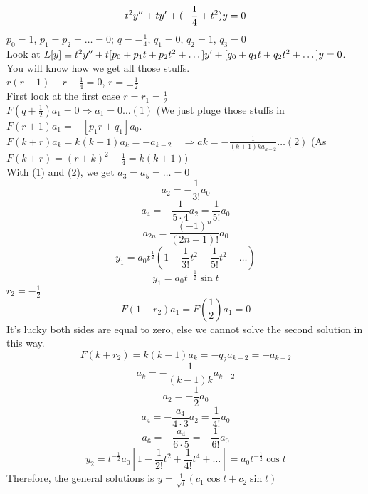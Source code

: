\begin{example}
\[t^2y^{\prime\prime}+ty^{\prime}+(-\frac{1}{4}+t^2)y=0
\]
$p_0=1$, $p_1=p_2=\dots=0$; $q=-\frac{1}{4}$, $q_1=0$, $q_2=1$, $q_3=0$\\Look at $L[y]\equiv t^2y^{\prime\prime}+t[p_0+p_1t+p_2t^2+\dots]y^{\prime}+[q_0+q_1t+q_2t^2+\dots]y=0$. You will know how we get all those stuffs.\\
$r(r-1)+r-\frac{1}{4}=0$, $r=\pm\frac{1}{2}$\\
First look at the first case $r=r_1=\frac{1}{2}$\\
$F(q+\frac{1}{2})a_1=0\Rightarrow a_1=0\dots(1)$ (We just pluge those stuffs in $F(r+1)a_1=-[p_1r+q_1]a_0$. \\
$F(k+r)a_k=k(k+1)a_k=-a_{k-2}\quad\Rightarrow ak=-\frac{1}{(k+1)ka_{k-2}}\dots(2)$  (As $F(k+r)=(r+k)^2-\frac{1}{4}=k(k+1)$)\\
With (1) and (2), we get $a_3=a_5=\dots=0$
\[a_2=-\frac{1}{3!}a_0
\]
\[a_4=-\frac{1}{5\cdot4}a_2=\frac{1}{5!}a_0
\]
\[a_{2n}=\frac{(-1)^n}{(2n+1)!}a_0
\]
\[y_1=a_0t^{\frac{1}{2}}(1-\frac{1}{3!}t^2+\frac{1}{5!}t^2-\dots)
\]
\[y_1=a_0t^{-\frac{1}{2}}\sin t
\]
$r_2=-\frac{1}{2}$
\[F(1+r_2)a_1=F(\frac{1}{2})a_1=0
\]
It's lucky both sides are equal to zero, else we cannot solve the second solution in this way.
\[F(k+r_2)=k(k-1)a_k=-q_2a_{k-2}=-a_{k-2}
\]
\[a_k=-\frac{1}{(k-1)k}a_{k-2}
\]
\[a_2=-\frac{1}{2}a_0
\]
\[a_4=-\frac{a_4}{4\cdot3}a_2=\frac{1}{4!}a_0
\]
\[a_6=-\frac{a_4}{6\cdot5}=-\frac{1}{6!}a_0
\]
\[y_2=t^{-\frac{1}{2}}a_0[1-\frac{1}{2!}t^2+\frac{1}{4!}t^4+\dots]=a_0t^{-\frac{1}{2}}\cos t
\]
Therefore, the general solutions is $y=\frac{1}{\sqrt{t}}(c_1\cos t+c_2\sin t)$
\end{example}

